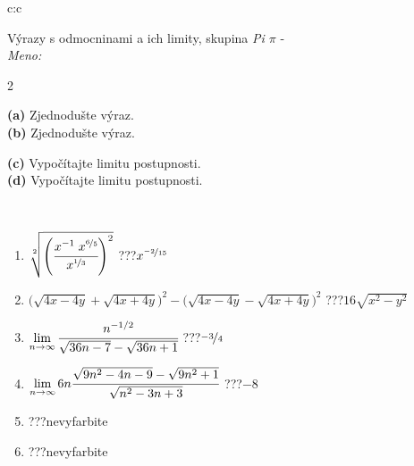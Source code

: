 \documentclass[10pt]{report}
\begin{document}
\begin{tabular}{c:c}
\begin{minipage}[c][104.5mm][t]{0.5\linewidth}
\begin{center}
\vspace{7mm}
{\huge {\Large Výrazy s odmocninami a ich limity}, skupina \textit{Pi $\pi$} -}\\[5mm]
\textit{Meno:}\phantom{xxxxxxxxxxxxxxxxxxxxxxxxxxxxxxxxxxxxxxxxxxxxxxxxxxxxxxxxxxxxxxxxx}\\[5mm]
\begin{minipage}{0.95\linewidth}
\begin{center}
{\small \begin{multicols}{2} \raggedright
\phantom{xxxxxxxxx}\textbf{(a)} Zjednodušte výraz. \\[1mm]
\phantom{xxxxxxxxx}\textbf{(b)} Zjednodušte výraz. \par \columnbreak
\textbf{(c)} Vypočítajte limitu postupnosti. \\[1mm]
\textbf{(d)} Vypočítajte limitu postupnosti.
\end{multicols}
}
\end{center}
\end{minipage}
\\[4mm]
\begin{minipage}{0.79\linewidth}
\begin{center}
\begin{varwidth}{\linewidth}
\begin{enumerate}
\small
\item $\sqrt[2]{\left(\cfrac{x^{-1}\;x^{\nicefrac{6}{5}}}{x^{\nicefrac{1}{3}}}\right)^{2}}$\quad \dotfill\; ???\;\dotfill \quad $x^{\nicefrac{-2}{15}}$
\item {\footnotesize{\scriptsize$\big(\sqrt{4x-4y}+\sqrt{4x+4y}\big)^2-\big(\sqrt{4x-4y}-\sqrt{4x+4y}\big)^2$}\quad \dotfill\; ???\;\dotfill \quad $16\sqrt{x^2-y^2}$}
\item $\lim\limits_{n\to\infty}\cfrac{n^{-1/2}}{\sqrt{36n-7}-\sqrt{36n+1}}$\quad \dotfill\; ???\;\dotfill \quad $\nicefrac{-3}{4}$
\item $\lim\limits_{n\to\infty}6n\cfrac{\sqrt{9n^2-4n-9}-\sqrt{9n^2+1}}{\sqrt{n^2-3n+3}}$\quad \dotfill\; ???\;\dotfill \quad $-8$
\item \quad \dotfill\; ???\;\dotfill \quad nevyfarbite
\item \quad \dotfill\; ???\;\dotfill \quad nevyfarbite
\end{enumerate}
\end{varwidth}

\end{center}
\end{minipage}
\end{center}
\end{minipage}
\end{tabular}
\end{document}
